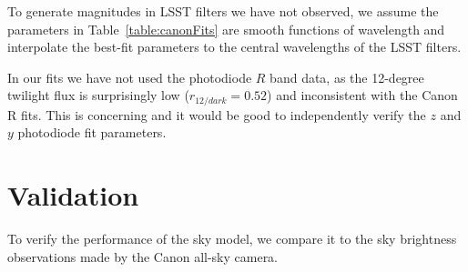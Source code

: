 \documentclass[]{spie}
\begin{document}
To generate magnitudes in LSST filters we have not observed, we assume the parameters in Table~\ref{table:canonFits} are smooth functions of wavelength and interpolate the best-fit parameters to the central wavelengths of the LSST filters.

In our fits we have not used the photodiode $R$ band data, as the 12-degree twilight flux is surprisingly low ($r_{12/dark}=0.52$) and inconsistent with the Canon R fits.  This is concerning and it would be good to independently verify the $z$ and $y$ photodiode fit parameters.


\section{Validation}\label{sec:validate}

To verify the performance of the sky model, we compare it to the sky brightness observations made by the Canon all-sky camera.
\end{document}
